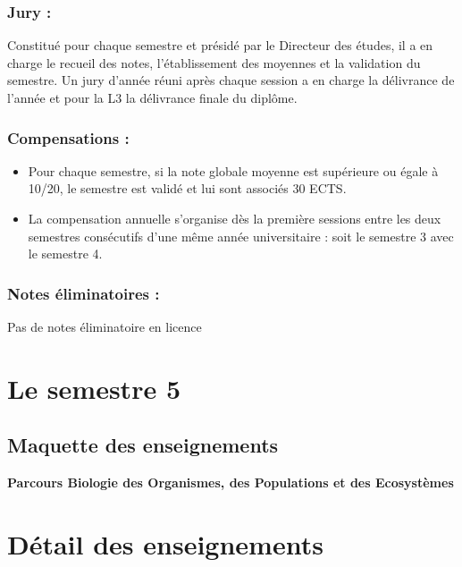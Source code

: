 \documentclass[10pt, a5paper]{report}
\begin{document}
\begin{spacing}{1.5}
\subsubsection*{Jury :} Constitué pour chaque semestre et présidé par le Directeur des études, il a en charge le recueil des notes, l’établissement des moyennes et la validation du semestre. Un jury d’année réuni après chaque session a en charge la délivrance de l’année et pour la L3 la délivrance finale du diplôme.

\subsubsection*{Compensations :}

\begin{itemize}
\item Pour chaque semestre, si la note globale moyenne est supérieure ou égale à 10/20, le semestre est validé et lui sont associés 30 ECTS.
\item La compensation annuelle s'organise dès la première sessions entre les deux semestres consécutifs d'une même année universitaire : soit le semestre 3 avec le semestre 4.
\end{itemize}

\subsubsection*{Notes éliminatoires :}

Pas de notes éliminatoire en licence

\newpage
\section*{Le semestre 5}

\subsection*{Maquette des enseignements}

\textbf{Parcours Biologie des Organismes, des Populations et des Ecosystèmes}
\newline



\section*{Détail des enseignements}


\end{spacing}
\end{document}
